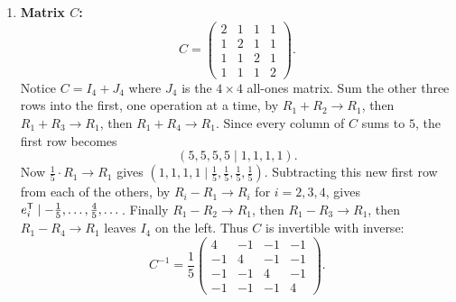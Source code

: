 \begin{exercisesolution*}
\begin{enumerate}[label=\textbf{(\alph*)}]
    \item \textbf{Matrix $C$:}
    \[
    C = \begin{pmatrix} 2 & 1 & 1 & 1 \\ 1 & 2 & 1 & 1 \\ 1 & 1 & 2 & 1 \\ 1 & 1 & 1 & 2 \end{pmatrix}.
    \]
    Notice $C = I_4 + J_4$ where $J_4$ is the $4 \times 4$ all-ones matrix.
    Sum the other three rows into the first, one operation at a time, by
    $R_1 + R_2 \to R_1$, then $R_1 + R_3 \to R_1$, then $R_1 + R_4 \to R_1$. Since every
    column of $C$ sums to $5$, the first row becomes
    \[
    (5, 5, 5, 5 \mid 1, 1, 1, 1).
    \]
    Now $\frac{1}{5} \cdot R_1 \to R_1$ gives $(1, 1, 1, 1 \mid \frac{1}{5}, \frac{1}{5}, \frac{1}{5}, \frac{1}{5})$.
    Subtracting this new first row from each of the others, by $R_i - R_1 \to R_i$ for $i = 2, 3, 4$, gives $e_i^{\mathsf{T}} \mid -\frac{1}{5}, \dots, \frac{4}{5}, \dots$.
    Finally $R_1 - R_2 \to R_1$, then $R_1 - R_3 \to R_1$, then $R_1 - R_4 \to R_1$ leaves $I_4$ on the left.
    Thus $C$ is invertible with inverse:
    \[
    C^{-1} = \frac{1}{5} \begin{pmatrix}
    4 & -1 & -1 & -1 \\
    -1 & 4 & -1 & -1 \\
    -1 & -1 & 4 & -1 \\
    -1 & -1 & -1 & 4
    \end{pmatrix}.
    \]


\end{enumerate}
\end{exercisesolution*}
